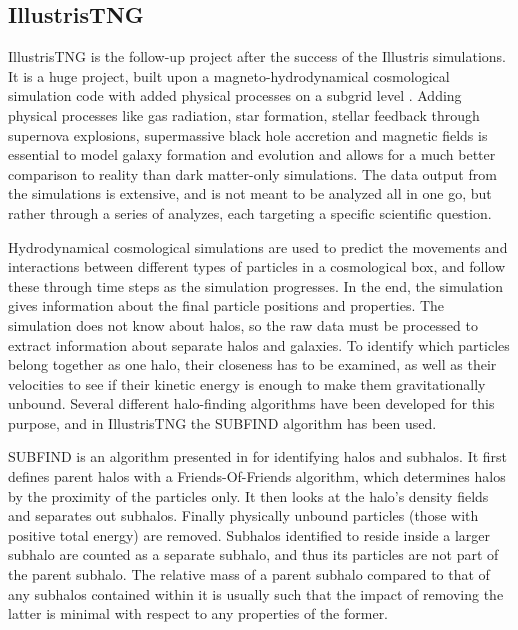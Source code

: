 \subsection{IllustrisTNG}
IllustrisTNG is the follow-up project after the success of the Illustris simulations. It is a huge project, built upon a magneto-hydrodynamical cosmological simulation code with added physical processes on a subgrid level \parencite{Weinberger2016}. Adding physical processes like gas radiation, star formation, stellar feedback through supernova explosions, supermassive black hole accretion and magnetic fields is essential to model galaxy formation and evolution and allows for a much better comparison to reality than dark matter-only simulations. The data output from the simulations is extensive, and is not meant to be analyzed all in one go, but rather through a series of analyzes, each targeting a specific scientific question. 

Hydrodynamical cosmological simulations are used to predict the movements and interactions between different types of particles in a cosmological box, and follow these through time steps as the simulation progresses. In the end, the simulation gives information about the final particle positions and properties. The simulation does not know about halos, so the raw data must be processed to extract information about separate halos and galaxies. To identify which particles belong together as one halo, their closeness has to be examined, as well as their velocities to see if their kinetic energy is enough to make them gravitationally unbound. Several different halo-finding algorithms have been developed for this purpose, and in IllustrisTNG the SUBFIND algorithm has been used.

SUBFIND is an algorithm presented in \textcite{Springel2001} for identifying halos and subhalos. It first defines parent halos with a Friends-Of-Friends algorithm, which determines halos by the proximity of the particles only. It then looks at the halo's density fields and separates out subhalos. Finally physically unbound particles (those with positive total energy) are removed. Subhalos identified to reside inside a larger subhalo are counted as a separate subhalo, and thus its particles are not part of the parent subhalo. The relative mass of a parent subhalo compared to that of any subhalos contained within it is usually such that the impact of removing the latter is minimal with respect to any properties of the former.



